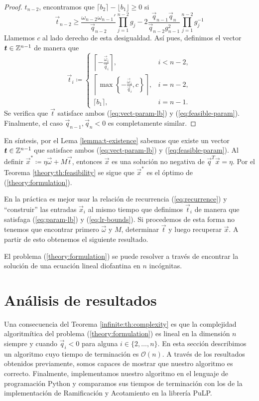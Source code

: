 \begin{proof}
	$t_{n-2}$, encontramos que $\lceil b_2 \rceil - \lfloor b_1 \rfloor \geq 0$ si
	\begin{equation*}
		\vec{t}_{n-2} \geq \frac{\omega_{n-2}\omega_{n-1}'}{\vec{q}_{n-2}}\prod_{j=1}^{n-2}g_j
		- 2\frac{\vec{q}_{n-1}\vec{q}_n}{\vec{q}_{n-2}g_{n-1}^2}
		\prod_{j=1}^{n-2}g_j^{-1}
	\end{equation*}
	Llamemos $c$ al lado derecho de esta desigualdad. Así pues, definimos el vector
	$\boldsymbol{t} \in \mathbb{Z}^{n-1}$ de manera que
	\begin{equation*}
		\vec{t}_i \coloneq \begin{cases}
			\left\lceil -\frac{\vec{\omega}_i}{\vec{q}_i} \right\rceil, & i < n - 2, \\[1em]
			\left\lceil \max\left\lbrace -\frac{\vec{\omega}_i}{\vec{q}_i}, c \right\rbrace
			\right\rceil, & i = n -2, \\[0.8em]
			\lceil b_1 \rceil, & i = n - 1.
		\end{cases}
	\end{equation*}
	Se verifica que $\vec{t}$ satisface ambos (\ref{eq:vect-param-lb}) y (\ref{eq:feasible-param}).
	Finalmente, el caso $\vec{q}_{n-1}, \vec{q}_n < 0$ es completamente similar.
\end{proof}

En síntesis, por el Lema \ref{lemma:t-existence} sabemos que existe un vector
$\boldsymbol{t} \in \mathbb{Z}^{n-1}$ que satisface ambos (\ref{eq:vect-param-lb}) y (\ref{eq:feasible-param}).
Al definir $\vec{x}^* \coloneq \eta\vec{\omega} + M\vec{t}$, entonces $\vec{x}$ es una solución no
negativa de $\vec{q}^T\vec{x} = \eta$. Por el Teorema \ref{theory:th:feasibility} se sigue que
$\vec{x}^*$ es el óptimo de (\ref{theory:formulation}).

En la práctica es mejor usar la relación de recurrencia (\ref{eq:recurrence}) y ``construir'' las
entradas $\vec{x}_i$ al mismo tiempo que definimos $\vec{t}_i$ de manera que satisfaga
(\ref{eq:param-lb}) y (\ref{eq:lr-bounds}). Si procedemos de esta forma no tenemos que encontrar primero
$\vec{\omega}$ y $M$, determinar $\vec{t}$ y luego recuperar $\vec{x}$. A partir de esto obtenemos
el siguiente resultado.
\begin{theorem}
	\label{infinite:th:complexity}
	El problema (\ref{theory:formulation}) se puede resolver a través de encontrar la solución de
	una ecuación lineal diofantina en $n$ incógnitas.
\end{theorem}

\section{Análisis de resultados}
\noindent
Una consecuencia del Teorema \ref{infinite:th:complexity} es que la complejidad algoritmítica del
problema (\ref{theory:formulation}) es lineal en la dimensión $n$ siempre y cuando $\vec{q}_i < 0$
para alguna $i \in \lbrace 2, \ldots, n\rbrace$. En esta sección describimos un algoritmo cuyo
tiempo de terminación es $\mathcal{O}(n)$. A través de los resultados obtenidos previamente, somos
capaces de mostrar que nuestro algoritmo es correcto. Finalmente, implementamos nuestro algoritmo en
el lenguaje de programación Python y comparamos sus tiempos de terminación con los de la
implementación de Ramificación y Acotamiento en la librería PuLP. 
